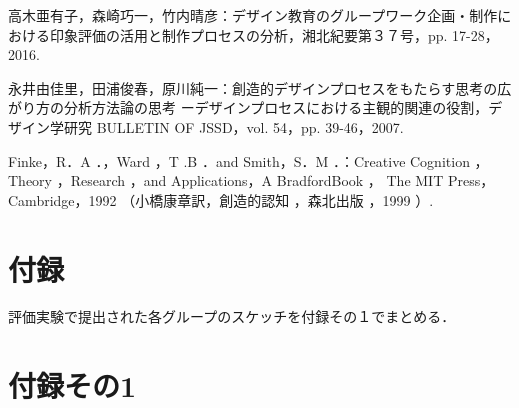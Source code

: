 \documentclass{funthesis}
\begin{document}
\begin{thebibliography}{9}
高木亜有子，森崎巧一，竹内晴彦：デザイン教育のグループワーク企画・制作における印象評価の活用と制作プロセスの分析，湘北紀要第３７号，pp. 17-28，2016.

永井由佳里，田浦俊春，原川純一：創造的デザインプロセスをもたらす思考の広がり方の分析方法論の思考 ーデザインプロセスにおける主観的関連の役割，デザイン学研究 BULLETIN OF JSSD，vol. 54，pp. 39-46，2007.

Finke，R．A ．，Ward ，T .B ．and Smith，S．M ．：Creative Cognition ， Theory ，Research ，and
Applications，A BradfordBook ， The MIT Press，Cambridge，1992 （小橋康章訳，創造的認知 ，森北出版 ，1999 ）.






\end{thebibliography}


\appendix

\chapter*{付録} %
評価実験で提出された各グループのスケッチを付録その１でまとめる．

\chapter*{付録その1}
\end{document}

